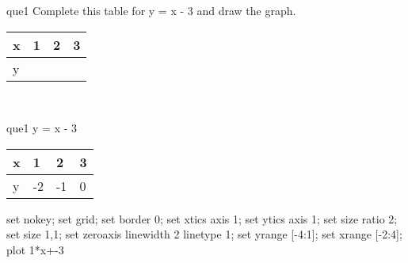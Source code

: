 \documentclass[13.5pt, varwidth=true]{beamer}
\begin{document}
\begin{frame}[shrink=19,fragile]
	\begin{beamercolorbox}[rounded=true, left, shadow=true,wd=14.8cm]{que1}
		 Complete this table for y = x - 3 and draw the graph. \\[0.3cm] \renewcommand{\arraystretch}{1.2}\begin{tabular}{|C|C|C|C|} \hline x & 1 & 2 & 3 \\ \hline y & & & \\ \hline \end{tabular}\\[0.3cm]
	\end{beamercolorbox}
\end{frame}
\begin{frame}[shrink=19,fragile]
	\begin{beamercolorbox}[rounded=true, left, shadow=true,wd=14.8cm]{que1}
		y = x - 3\renewcommand{\arraystretch}{1.2}\begin{tabular}{|C|C|C|C|} \hline x & 1 & 2 & 3 \\ \hline y & -2 & -1 & 0\\ \hline \end{tabular}\begin{gnuplot}[terminal=pdf] set nokey; set grid; set border 0; set xtics axis 1; set ytics axis 1; set size ratio 2; set size 1,1; set zeroaxis linewidth 2 linetype 1; set yrange [-4:1]; set xrange [-2:4]; plot 1*x+-3 \end{gnuplot}
	\end{beamercolorbox}
\end{frame}
\end{document}
